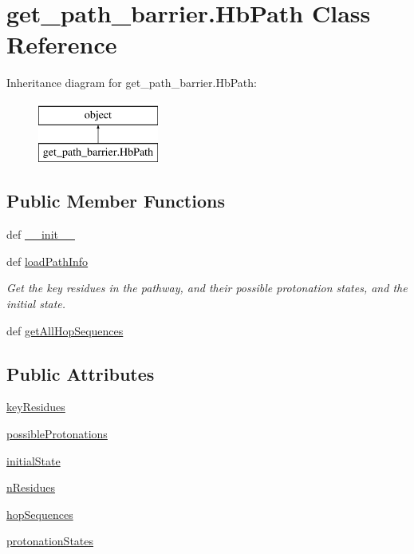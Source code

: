 \hypertarget{classget__path__barrier_1_1_hb_path}{\section{get\-\_\-path\-\_\-barrier.\-Hb\-Path Class Reference}
\label{classget__path__barrier_1_1_hb_path}
}
Inheritance diagram for get\-\_\-path\-\_\-barrier.\-Hb\-Path\-:\begin{figure}[H]
\begin{center}
\leavevmode
\includegraphics[height=2.000000cm]{classget__path__barrier_1_1_hb_path}
\end{center}
\end{figure}
\subsection*{Public Member Functions}
\begin{DoxyCompactItemize}
\item 
def \hyperlink{classget__path__barrier_1_1_hb_path_ac8526be6c34f93d3991d772e51ac2dd0}{\-\_\-\-\_\-init\-\_\-\-\_\-}
\item 
def \hyperlink{classget__path__barrier_1_1_hb_path_aba025f763752636443417573fc82e941}{load\-Path\-Info}
\begin{DoxyCompactList}\small\item\em Get the key residues in the pathway, and their possible protonation states, and the initial state. \end{DoxyCompactList}\item 
def \hyperlink{classget__path__barrier_1_1_hb_path_a7b689f661b263b4a027559f306b44567}{get\-All\-Hop\-Sequences}
\end{DoxyCompactItemize}
\subsection*{Public Attributes}
\begin{DoxyCompactItemize}
\item 
\hyperlink{classget__path__barrier_1_1_hb_path_af574f30a4a9297c5b798a9f5ab93429c}{key\-Residues}
\item 
\hyperlink{classget__path__barrier_1_1_hb_path_aa3cc8420eaf75f40689de3c1c4ef9143}{possible\-Protonations}
\item 
\hyperlink{classget__path__barrier_1_1_hb_path_acb500e7ef9452b85d3a037ae96b952d3}{initial\-State}
\item 
\hyperlink{classget__path__barrier_1_1_hb_path_abde19f996710977a200bbd380327d992}{n\-Residues}
\item 
\hyperlink{classget__path__barrier_1_1_hb_path_a838cc727a1853ae9dbcda45158c4ff1d}{hop\-Sequences}
\item 
\hyperlink{classget__path__barrier_1_1_hb_path_a232b46f1966ab71a5c5ffef1c476ac8f}{protonation\-States}
\end{DoxyCompactItemize}



